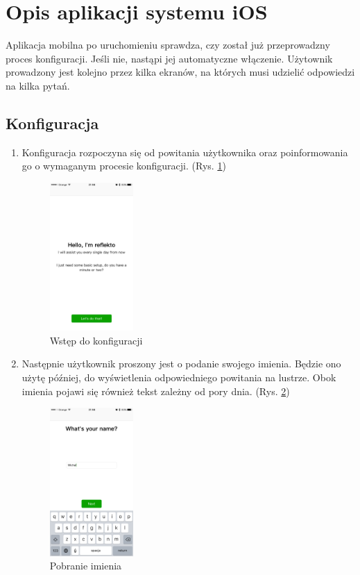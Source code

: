 \documentclass[a4paper,11pt]{article}
\begin{document}
\section{Opis aplikacji systemu iOS}

Aplikacja mobilna po uruchomieniu sprawdza, czy został już przeprowadzny proces konfiguracji. Jeśli nie, nastąpi jej automatyczne włączenie. Użytownik prowadzony jest kolejno przez kilka ekranów, na których musi udzielić odpowiedzi na kilka pytań.

\subsection{Konfiguracja}

\begin{enumerate}
	\item  Konfiguracja rozpoczyna się od powitania użytkownika oraz poinformowania go o wymaganym procesie konfiguracji. (Rys. \ref{setup1})
	\begin{figure}[H]
		\includegraphics[width=0.3\textwidth,center]{ios-screens/setup1.png}
		\caption {Wstęp do konfiguracji}
		\label{setup1}
	\end{figure}

	\item Następnie użytkownik proszony jest o podanie swojego imienia. Będzie ono użytę później, do wyświetlenia odpowiedniego powitania na lustrze. Obok imienia pojawi się również tekst zależny od pory dnia. (Rys. \ref{setup2})
	\begin{figure}[H]
	\includegraphics[width=0.3\textwidth,center]{ios-screens/setup2.png}
	\caption {Pobranie imienia}
	\label{setup2}
	\end{figure}


\end{enumerate}
\end{document}
